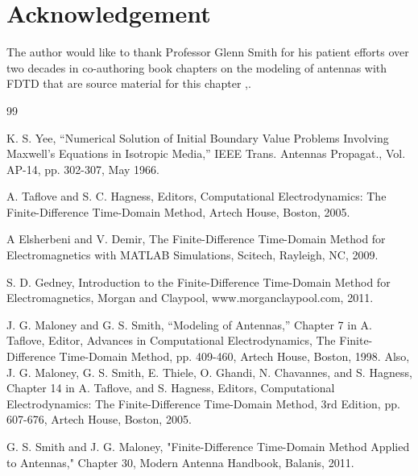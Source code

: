 \section{Acknowledgement}
The author would like to thank Professor Glenn Smith for his patient efforts over two decades in co-authoring book chapters on the modeling of antennas with FDTD that are source material for this chapter \cite{MaloneySmithAntChapters},\cite{BalanisHB}.

\begin{thebibliography}{99}

 K. S. Yee, ``Numerical Solution of Initial Boundary Value Problems Involving Maxwell's Equations in Isotropic Media,'' IEEE Trans. Antennas Propagat., Vol. AP-14, pp. 302-307, May 1966.

 A. Taflove and S. C. Hagness, Editors, Computational Electrodynamics: The Finite-Difference Time-Domain Method, Artech House, Boston, 2005.

  A Elsherbeni and V. Demir, The Finite-Difference Time-Domain Method for Electromagnetics with MATLAB Simulations, Scitech, Rayleigh, NC, 2009.

 S. D. Gedney, Introduction to the Finite-Difference Time-Domain Method for Electromagnetics, Morgan and Claypool, www.morganclaypool.com, 2011.

 J. G. Maloney and G. S. Smith, ``Modeling of Antennas,'' Chapter 7 in A. Taflove, Editor, Advances in Computational Electrodynamics, The Finite-Difference Time-Domain Method, pp. 409-460, Artech House, Boston, 1998. Also, J. G. Maloney, G. S. Smith, E. Thiele, O. Ghandi, N. Chavannes, and S. Hagness, Chapter 14 in A. Taflove, and S. Hagness, Editors, Computational Electrodynamics: The Finite-Difference Time-Domain Method, 3rd Edition, pp. 607-676, Artech House, Boston, 2005.

 G. S. Smith and J. G. Maloney, "Finite-Difference Time-Domain Method Applied to Antennas," Chapter 30, Modern Antenna Handbook, Balanis, 2011.

\end{thebibliography}


